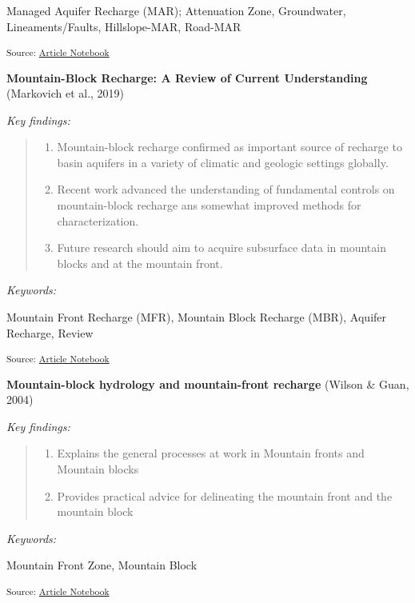 \documentclass[
]{agujournal2019}
\providecommand{\tightlist}{%
  \setlength{\itemsep}{0pt}\setlength{\parskip}{0pt}}\usepackage{longtable,booktabs,array}
\begin{document}
Managed Aquifer Recharge (MAR); Attenuation Zone, Groundwater,
Lineaments/Faults, Hillslope-MAR, Road-MAR

\textsubscript{Source:
\href{https://Ryan3Lima.github.io/ATUR-ORE/index.ipynb.html}{Article
Notebook}}

\textbf{Mountain-Block Recharge: A Review of Current Understanding}
(Markovich et al., 2019)

\emph{Key findings:}

\begin{quote}
\begin{enumerate}
\def\labelenumi{\arabic{enumi}.}
\tightlist
\item
  Mountain-block recharge confirmed as important source of recharge to
  basin aquifers in a variety of climatic and geologic settings
  globally.
\item
  Recent work advanced the understanding of fundamental controls on
  mountain-block recharge ans somewhat improved methods for
  characterization.
\item
  Future research should aim to acquire subsurface data in mountain
  blocks and at the mountain front.
\end{enumerate}
\end{quote}

\emph{Keywords:}

Mountain Front Recharge (MFR), Mountain Block Recharge (MBR), Aquifer
Recharge, Review

\textsubscript{Source:
\href{https://Ryan3Lima.github.io/ATUR-ORE/index.ipynb.html}{Article
Notebook}}

\textbf{Mountain-block hydrology and mountain-front recharge} (Wilson \&
Guan, 2004)

\emph{Key findings:}

\begin{quote}
\begin{enumerate}
\def\labelenumi{\arabic{enumi}.}
\tightlist
\item
  Explains the general processes at work in Mountain fronts and Mountain
  blocks
\item
  Provides practical advice for delineating the mountain front and the
  mountain block
\end{enumerate}
\end{quote}

\emph{Keywords:}

Mountain Front Zone, Mountain Block

\textsubscript{Source:
\href{https://Ryan3Lima.github.io/ATUR-ORE/index.ipynb.html}{Article
Notebook}}
\end{document}
